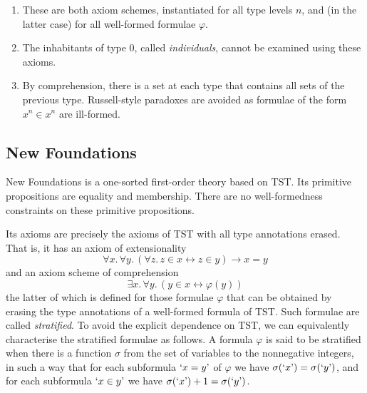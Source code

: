 \begin{remarks}\mbox{\negthinspace}
	\begin{enumerate}
		\item These are both axiom schemes, instantiated for all type levels \( n \), and (in the latter case) for all well-formed formulae \( \varphi \).
		\item The inhabitants of type 0, called \emph{individuals}, cannot be examined using these axioms.
		\item By comprehension, there is a set at each type that contains all sets of the previous type.
		Russell-style paradoxes are avoided as formulae of the form \( x^n \in x^n \) are ill-formed.
	\end{enumerate}
\end{remarks}

\subsection{New Foundations}

New Foundations is a one-sorted first-order theory based on TST.
Its primitive propositions are equality and membership.
There are no well-formedness constraints on these primitive propositions.

Its axioms are precisely the axioms of TST with all type annotations erased.
That is, it has an axiom of extensionality
\[ \forall x.\, \forall y.\, (\forall z.\, z \in x \leftrightarrow z \in y) \to x = y \]
and an axiom scheme of comprehension
\[ \exists x.\, \forall y.\, (y \in x \leftrightarrow \varphi(y)) \]
the latter of which is defined for those formulae \( \varphi \) that can be obtained by erasing the type annotations of a well-formed formula of TST.
Such formulae are called \emph{stratified}.
To avoid the explicit dependence on TST, we can equivalently characterise the stratified formulae as follows.
A formula \( \varphi \) is said to be stratified when there is a function \( \sigma \) from the set of variables to the nonnegative integers, in such a way that for each subformula \( \text{`}x = y\text{'} \) of \( \varphi \) we have \( \sigma(\text{`}x\text{'}) = \sigma(\text{`}y\text{'}) \), and for each subformula \( \text{`}x \in y\text{'} \) we have \( \sigma(\text{`}x\text{'}) + 1 = \sigma(\text{`}y\text{'}) \).


